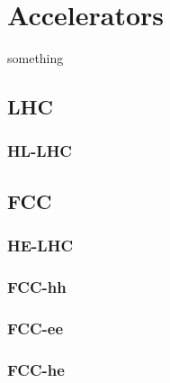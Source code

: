 
\chapter{Accelerators}
\label{c:accel} %

something
\section{LHC}
\subsection{HL-LHC}
\section{FCC}
\subsection{HE-LHC}
\subsection{FCC-hh}
\subsection{FCC-ee}
\subsection{FCC-he}
